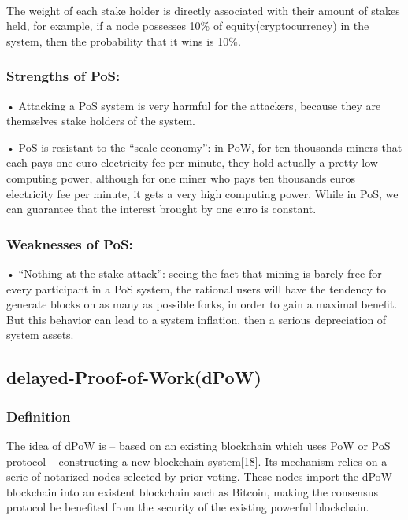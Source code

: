 \documentclass[doublespacing]{bmcart}
\begin{document}
\begin{CJK*}{UTF8}{gbsn}
	\paragraph{}
	 The weight of each stake holder is directly associated with their amount of stakes held, for example, if a node possesses 10\% of equity(cryptocurrency) in the system, then the probability that it wins is 10\%.
	\subsubsection*{Strengths of PoS:}	
    • Attacking a PoS system is very harmful for the attackers, because they are themselves stake holders of the system.
    \par • PoS is resistant to the “scale economy”: in PoW, for ten thousands miners that each pays one euro electricity fee per minute, they hold actually a pretty low computing power, although for one miner who pays ten thousands euros electricity fee per minute, it gets a very high computing power. While in PoS, we can guarantee that the interest brought by one euro is constant.
	\subsubsection*{Weaknesses of PoS:}	
    • “Nothing-at-the-stake attack”: seeing the fact that mining is barely free for every participant in a PoS system, the rational users will have the tendency to generate blocks on as many as possible forks, in order to gain a maximal benefit. But this behavior can lead to a system inflation, then a serious depreciation of system assets.
    
    \subsection{delayed-Proof-of-Work(dPoW)}
    \subsubsection*{Definition}	
    The idea of dPoW is – based on an existing blockchain which uses PoW or PoS protocol – constructing a new blockchain system[18]. Its mechanism relies on a serie of notarized nodes selected by prior voting. These nodes import the dPoW blockchain into an existent blockchain such as Bitcoin, making the consensus protocol be benefited from the security of the existing powerful blockchain.  

\end{CJK*}
\end{document}
